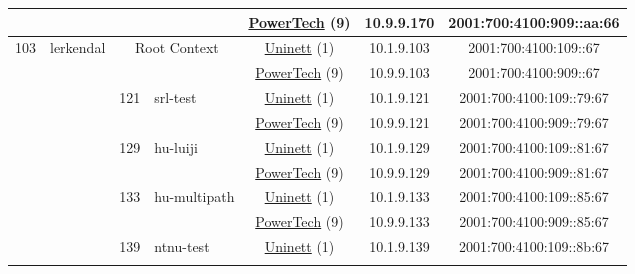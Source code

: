 \begin{small}
\begin{center}
\begin{longtable}{|c|c|c|c|c|c|c|c|}
  &  &  &  & \multicolumn{2}{|c|}{\tiny{\href{http://www.powertech.no}{PowerTech} (9)}} & \tiny{10.9.9.170} & \tiny{2001:700:4100:909::aa:66} \\ \hline
 \multirow{20}{*}{\tiny{103}} & \multicolumn{1}{|l|}{\multirow{20}{*}{\tiny{lerkendal}}} & \multicolumn{2}{|c|}{\multirow{2}{*}{\tiny{Root Context}}} & \multicolumn{2}{|c|}{\tiny{\href{https://www.uninett.no}{Uninett} (1)}} & \tiny{10.1.9.103} & \tiny{2001:700:4100:109::67} \\* \cline{5-5}\cline{6-6}\cline{7-7}\cline{8-8}
  &  & \multicolumn{2}{|c|}{} & \multicolumn{2}{|c|}{\tiny{\href{http://www.powertech.no}{PowerTech} (9)}} & \tiny{10.9.9.103} & \tiny{2001:700:4100:909::67} \\* \cline{3-3}\cline{4-4}\cline{5-5}\cline{6-6}\cline{7-7}\cline{8-8}
  &  & \multirow{2}{*}{\tiny{121}} & \multicolumn{1}{|l|}{\multirow{2}{*}{\tiny{srl-test}}} & \multicolumn{2}{|c|}{\tiny{\href{https://www.uninett.no}{Uninett} (1)}} & \tiny{10.1.9.121} & \tiny{2001:700:4100:109::79:67} \\* \cline{5-5}\cline{6-6}\cline{7-7}\cline{8-8}
  &  &  &  & \multicolumn{2}{|c|}{\tiny{\href{http://www.powertech.no}{PowerTech} (9)}} & \tiny{10.9.9.121} & \tiny{2001:700:4100:909::79:67} \\* \cline{3-3}\cline{4-4}\cline{5-5}\cline{6-6}\cline{7-7}\cline{8-8}
  &  & \multirow{2}{*}{\tiny{129}} & \multicolumn{1}{|l|}{\multirow{2}{*}{\tiny{hu-luiji}}} & \multicolumn{2}{|c|}{\tiny{\href{https://www.uninett.no}{Uninett} (1)}} & \tiny{10.1.9.129} & \tiny{2001:700:4100:109::81:67} \\* \cline{5-5}\cline{6-6}\cline{7-7}\cline{8-8}
  &  &  &  & \multicolumn{2}{|c|}{\tiny{\href{http://www.powertech.no}{PowerTech} (9)}} & \tiny{10.9.9.129} & \tiny{2001:700:4100:909::81:67} \\* \cline{3-3}\cline{4-4}\cline{5-5}\cline{6-6}\cline{7-7}\cline{8-8}
  &  & \multirow{2}{*}{\tiny{133}} & \multicolumn{1}{|l|}{\multirow{2}{*}{\tiny{hu-multipath}}} & \multicolumn{2}{|c|}{\tiny{\href{https://www.uninett.no}{Uninett} (1)}} & \tiny{10.1.9.133} & \tiny{2001:700:4100:109::85:67} \\* \cline{5-5}\cline{6-6}\cline{7-7}\cline{8-8}
  &  &  &  & \multicolumn{2}{|c|}{\tiny{\href{http://www.powertech.no}{PowerTech} (9)}} & \tiny{10.9.9.133} & \tiny{2001:700:4100:909::85:67} \\* \cline{3-3}\cline{4-4}\cline{5-5}\cline{6-6}\cline{7-7}\cline{8-8}
  &  & \multirow{2}{*}{\tiny{139}} & \multicolumn{1}{|l|}{\multirow{2}{*}{\tiny{ntnu-test}}} & \multicolumn{2}{|c|}{\tiny{\href{https://www.uninett.no}{Uninett} (1)}} & \tiny{10.1.9.139} & \tiny{2001:700:4100:109::8b:67} \\* \cline{5-5}\cline{6-6}\cline{7-7}\cline{8-8}

\end{longtable}
\end{center}
\end{small}
